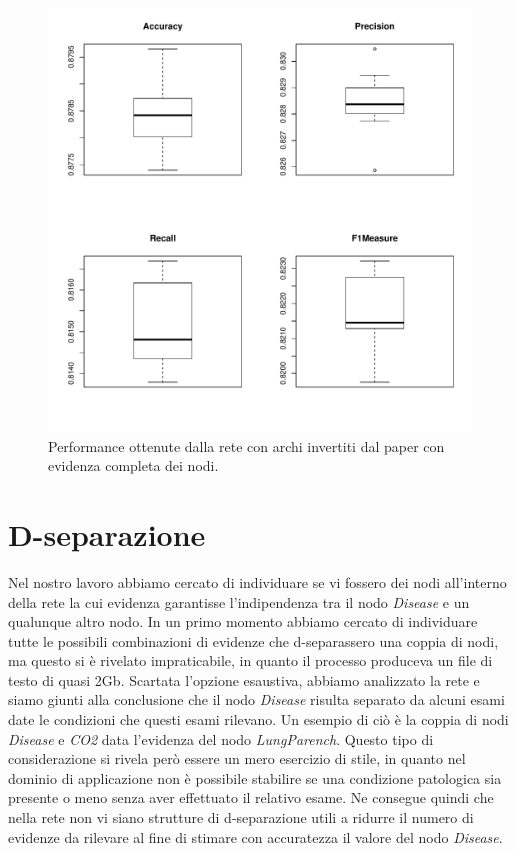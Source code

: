 \begin{figure}
	\centering
	\includegraphics[width=0.7\linewidth]{images/reversed_performance}
	\caption{Performance ottenute dalla rete con archi invertiti dal paper con evidenza completa dei nodi.}
	\label{fig:reversedperformance}
\end{figure}


\section{D-separazione}
Nel nostro lavoro abbiamo cercato di individuare se vi fossero dei nodi all'interno della rete la cui evidenza garantisse l'indipendenza tra il nodo \textit{Disease} e un qualunque altro nodo. In un primo momento abbiamo cercato di individuare tutte le possibili combinazioni di evidenze che d-separassero una coppia di nodi, ma questo si è rivelato impraticabile, in quanto il processo produceva un file di testo di quasi 2Gb. Scartata l'opzione esaustiva, abbiamo analizzato la rete e siamo giunti alla conclusione che il nodo \textit{Disease} risulta separato da alcuni esami date le condizioni che questi esami rilevano. Un esempio di ciò è la coppia di nodi \textit{Disease} e \textit{CO2} data l'evidenza del nodo \textit{LungParench}. Questo tipo di considerazione si rivela però essere un mero esercizio di stile, in quanto nel dominio di applicazione non è possibile stabilire se una condizione patologica sia presente o meno senza aver effettuato il relativo esame. Ne consegue quindi che nella rete non vi siano strutture di d-separazione utili a ridurre il numero di evidenze da rilevare al fine di stimare con accuratezza il valore del nodo \textit{Disease}.


